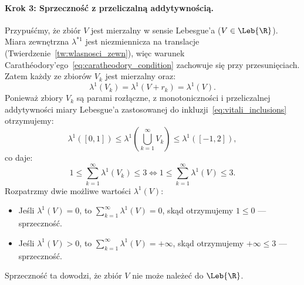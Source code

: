 \begin{dow}
    \paragraph{Krok 3: Sprzeczność z przeliczalną addytywnością.}
    Przypuśćmy, że zbiór $V$ jest mierzalny w sensie Lebesgue'a ($V \in \Leb{\R}$).
    Miara zewnętrzna $\lambda^{*1}$ jest niezmiennicza na translacje (Twierdzenie~\ref{tw:wlasnosci_zewn}), więc warunek Carathéodory'ego~\eqref{eq:caratheodory_condition} zachowuje się przy przesunięciach. Zatem każdy ze zbiorów $V_k$ jest mierzalny oraz:
    \begin{equation*}
        \lambda^1(V_k) = \lambda^1(V + r_k) = \lambda^1(V).
    \end{equation*}
    Ponieważ zbiory $V_k$ są parami rozłączne, z monotoniczności i przeliczalnej addytywności miary Lebesgue'a zastosowanej do inkluzji~\eqref{eq:vitali_inclusions} otrzymujemy:
    \begin{equation*}
        \lambda^1([0, 1]) \le \lambda^1\left(\bigcup_{k=1}^\infty V_k\right) \le \lambda^1([-1, 2]),
    \end{equation*}
    co daje:
    \begin{equation*}
        1 \le \sum_{k=1}^\infty \lambda^1(V_k) \le 3 \iff 1 \le \sum_{k=1}^\infty \lambda^1(V) \le 3.
    \end{equation*}
    Rozpatrzmy dwie możliwe wartości $\lambda^1(V)$:
    \begin{itemize}
        \item Jeśli $\lambda^1(V) = 0$, to $\sum_{k=1}^\infty \lambda^1(V) = 0$, skąd otrzymujemy $1 \le 0$ — sprzeczność.
        \item Jeśli $\lambda^1(V) > 0$, to $\sum_{k=1}^\infty \lambda^1(V) = +\infty$, skąd otrzymujemy $+\infty \le 3$ — sprzeczność.
    \end{itemize}
    Sprzeczność ta dowodzi, że zbiór $V$ nie może należeć do $\Leb{\R}$.
\end{dow}
